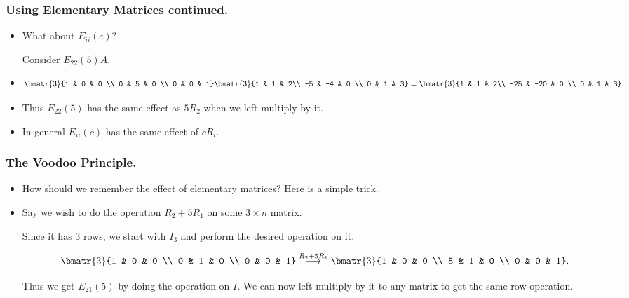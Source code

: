 \begin{frame}%
  \frametitle{Using Elementary Matrices continued.}
  \begin{itemize}%
 
\item What about $E_{ii}(c)$?

Consider  $E_{22}(5)A$.

\item
$$\bmatr{3}{1 & 0 & 0 \\
           0 & 5 & 0 \\
            0 & 0 & 1}
\bmatr{3}{1 & 1 & 2\\
                -5 & -4 & 0 \\
                0 & 1 & 3} =
\bmatr{3}{1 & 1 & 2\\
          -25 & -20 & 0 \\
          0 & 1 & 3}.$$
\item Thus $E_{22}(5)$ has the same effect as $5R_2$ when
we left multiply by it.

\item In general $E_{ii}(c)$ has the same effect of $cR_i$.
\end{itemize}
\end{frame}
%
\begin{frame}%
  \frametitle{The Voodoo Principle.}
  \begin{itemize}%
 
\item How should we remember the effect of elementary matrices?
Here is a simple trick.

\item Say we wish to do the operation $R_2+5R_1$ on some $3\times
n$ matrix.

Since it has $3$ rows, we start with $I_3$ and perform the desired
operation on it.

$$\bmatr{3}{1 & 0 & 0 \\ 0 & 1 & 0 \\ 0 & 0 & 1}
\stackrel{R_2+5R_1}{\longrightarrow}
\bmatr{3}{1 & 0 & 0 \\ 5 & 1 & 0 \\ 0 & 0 & 1}.$$

Thus we get $E_{21}(5)$ by doing the operation on $I$. We can now left
multiply by it to any matrix to get the same row operation.


\end{itemize}
\end{frame}

